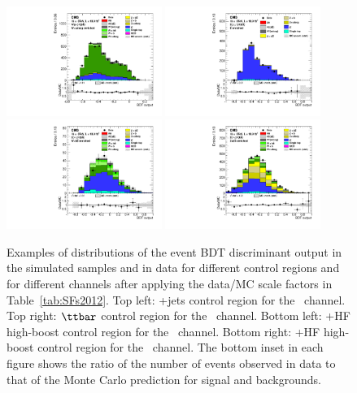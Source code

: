 \documentclass[12pt,twoside,a4paper,cmspaper,final,collab]{cms-tdr}
\begin{document}
\begin{figure}[tbh]
 \begin{center}
   \includegraphics[width=0.45\textwidth]{WudscgBDTWen_BDTWen_VH_unweighted}
    \includegraphics[width=0.45\textwidth]{TTbarBDTZmm_BDTZmm_VH_unweighted}
    \includegraphics[width=0.45\textwidth]{WbbBDTZnn_BDTZnn_VH_unweighted}
    \includegraphics[width=0.45\textwidth]{ZbbBDTZnn_BDTZnn_VH_unweighted}
    \caption{Examples of distributions of the event BDT discriminant output in the simulated
      samples and in data for different control regions and for different channels after applying the
      data/MC scale factors in Table~\ref{tab:SFs2012}. Top left:
      \PW+jets control region for the \WenH\ channel. Top
        right: $\ttbar$ control region for
      the \ZmmH\ channel. Bottom left: \PW+HF high-boost control region for the \ZnnH\
      channel. Bottom right: \cPZ+HF
      high-boost control region for the \ZnnH\ channel. The bottom inset in each
      figure shows the ratio of the number of events observed in data to that
      of the Monte Carlo prediction for signal and backgrounds.
    }
    \label{fig:control_regions_BDT}
  \end{center}
\end{figure}
\end{document}
